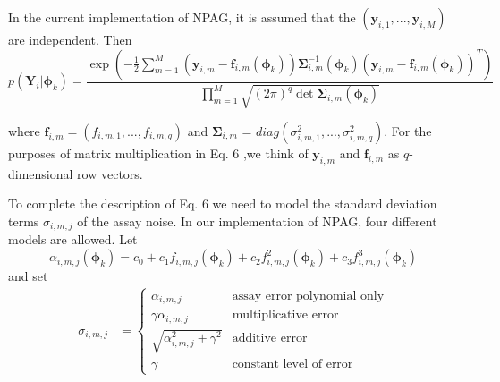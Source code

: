 In the current implementation of NPAG, it is assumed that the $( \bm{y}_{i,1}, ... , \bm{y}_{i,M})$ are independent.   %
Then
\begin{equation}
		 p( \bm{Y}_i \vert \bm{\phi}_k) %
	= 
            \frac{ \exp\left(
	      {\displaystyle
	         - \frac{1}{2} \sum_{m = 1}^M	            
                         ( \bm{y}_{i,m}  -  \bm{f}_{i,m}( \bm{\phi}_k ) )  \bm\Sigma_{i,m}^{-1}( \bm{\phi}_k) 
( \bm{y}_{i,m}  -  \bm{f}_{i,m}( \bm{\phi}_k )) ^T
                  }
               \right)}
               {\prod_{m = 1}^M \sqrt { (2\pi)^q \det \bm{\Sigma}_{i,m}( \bm{\phi}_k)} } \label{eqnmetric}
\end{equation}

\noindent where $\bm{f}_{i,m}=(  f_{i,m,1}, ... ,f_{i,m,q})$ %
and $\bm{\Sigma}_{i,m}$ = $diag(\sigma_{i,m,1}^2, ..., \sigma_{i,m,q}^2)$. %
%
For the purposes of matrix multiplication in Eq. 6 ,we think of $\bm{y}_{i,m}$ and $\bm{f}_{i,m}$ as $q$-dimensional row vectors.

To complete the description of Eq. 6 we need to model the standard deviation terms $\sigma_{i,m,j}$ of the assay noise. %
In our implementation of NPAG, four different models are allowed. Let
\begin{equation}
\alpha_{i,m,j}( \bm{\phi}_k ) = c_0 + c_1 f_{i,m,j}( \bm{\phi}_k )  + c_2 f_{i,m,j}^2( \bm{\phi}_k) + c_3 f_{i,m,j}^3(\bm{\phi}_k)
\end{equation}
and set
\begin{align}
\sigma_{i,m,j} & =
\begin{cases}
\alpha_{i,m,j}& \mbox{assay error polynomial only} \\
\gamma \alpha_{i,m,j}& \mbox{multiplicative error} \\
\sqrt{ \alpha_{i,m,j}^2 + \gamma^2} & \mbox{additive error} \\ %
\gamma & \mbox{constant level of error}
\end{cases} \label{NoiseModel}
\end{align}






